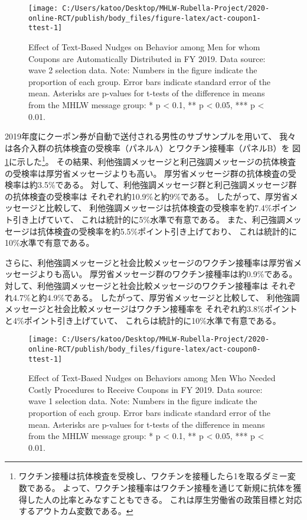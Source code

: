 \documentclass[
  11pt,
  a4paper,
]{article}
\begin{document}
\begin{figure}[t]
\texttt{[image: C:/Users/katoo/Desktop/MHLW-Rubella-Project/2020-online-RCT/publish/body\_files/figure-latex/act-coupon1-ttest-1]} \caption{Effect of Text-Based Nudges on Behavior among Men for whom Coupons are Automatically Distributed in FY 2019. Data source: wave 2 selection data. Note: Numbers in the figure indicate the proportion of each group. Error bars indicate standard error of the mean. Asterisks are p-values for t-tests of the difference in means from the MHLW message group: * p < 0.1, ** p < 0.05, *** p < 0.01.}\label{fig:act-coupon1-ttest}
\end{figure}

2019年度にクーポン券が自動で送付される男性のサブサンプルを用いて、
我々は各介入群の抗体検査の受検率（パネルA）とワクチン接種率（パネルB）を
図\ref{fig:act-coupon1-ttest}に示した\footnote{ワクチン接種は抗体検査を受検し、ワクチンを接種したら1を取るダミー変数である。
  よって、ワクチン接種率はワクチン接種を通じて新規に抗体を獲得した人の比率とみなすこともできる。
  これは厚生労働省の政策目標と対応するアウトカム変数である。}。
その結果、利他強調メッセージと利己強調メッセージの抗体検査の受検率は厚労省メッセージよりも高い。
厚労省メッセージ群の抗体検査の受検率は約3.5\%である。
対して、利他強調メッセージ群と利己強調メッセージ群の抗体検査の受検率は
それぞれ約10.9\%と約9\%である。
したがって、厚労省メッセージと比較して、
利他強調メッセージは抗体検査の受検率を約7.4\%ポイント引き上げていて、
これは統計的に5\%水準で有意である。
また、利己強調メッセージは抗体検査の受検率を約5.5\%ポイント引き上げており、
これは統計的に10\%水準で有意である。

さらに、利他強調メッセージと社会比較メッセージのワクチン接種率は厚労省メッセージよりも高い。
厚労省メッセージ群のワクチン接種率は約0.9\%である。
対して、利他強調メッセージと社会比較メッセージのワクチン接種率は
それぞれ4.7\%と約4.9\%である。
したがって、厚労省メッセージと比較して、
利他強調メッセージと社会比較メッセージはワクチン接種率を
それぞれ約3.8\%ポイントと4\%ポイント引き上げていて、
これらは統計的に10\%水準で有意である。

\begin{figure}[t]
\texttt{[image: C:/Users/katoo/Desktop/MHLW-Rubella-Project/2020-online-RCT/publish/body\_files/figure-latex/act-coupon0-ttest-1]} \caption{Effect of Text-Based Nudges on Behaviors among Men Who Needed Costly Procedures to Receive Coupons in FY 2019. Data source: wave 1 selection data. Note: Numbers in the figure indicate the proportion of each group. Error bars indicate standard error of the mean. Asterisks are p-values for t-tests of the difference in means from the MHLW message group: * p < 0.1, ** p < 0.05, *** p < 0.01.}\label{fig:act-coupon0-ttest}
\end{figure}
\end{document}
